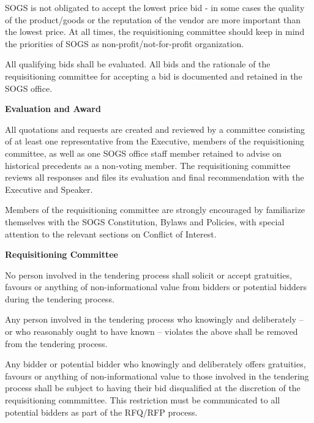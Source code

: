 \begin{longenum}[label*=\thesection.\arabic*., align=left]
\begin{longenum} [label*=\arabic*., align=left]
		\item SOGS is not obligated to accept the lowest price bid - in some cases the quality of the product/goods or the reputation of the vendor are more important than the lowest price. At all times, the requisitioning committee should keep in mind the priorities of SOGS as non-profit/not-for-profit organization.
		
		\item All qualifying bids shall be evaluated. All bids and the rationale of the requisitioning committee for accepting a bid is documented and retained in the SOGS office.
\end{longenum}

\item \textbf{Evaluation and Award}

\begin{longenum} [label*=\arabic*., align=left]
		\item All quotations and requests are created and reviewed by a committee consisting of at least one representative from the Executive, members of the requisitioning committee, as well as one SOGS office staff member retained to advise on historical precedents as a non-voting member. The requisitioning committee reviews all responses and files its evaluation and final recommendation with the Executive and Speaker. 
		
		\item Members of the requisitioning committee are strongly encouraged by familiarize themselves with the SOGS Constitution, Bylaws and Policies, with special attention to the relevant sections on Conflict of Interest.
		
\end{longenum}

\item \textbf{Requisitioning Committee}

\begin{longenum} [label*=\arabic*., align=left]
		\item No person involved in the tendering process shall solicit or accept gratuities, favours or anything of non-informational value from bidders or potential bidders during the tendering process. 
		
		\item Any person involved in the tendering process who knowingly and deliberately – or who reasonably ought to have known – violates the above shall be removed from the tendering process. 
		
		\item Any bidder or potential bidder who knowingly and deliberately offers gratuities, favours or anything of non-informational value to those involved in the tendering process shall be subject to having their bid disqualified at the discretion of the requisitioning commmittee. This restriction must be communicated to all potential bidders as part of the RFQ/RFP process.
\end{longenum}


\end{longenum}

